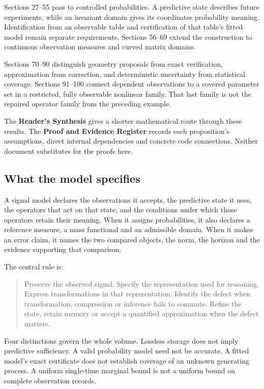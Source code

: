 \documentclass[11pt,letterpaper]{article}
\begin{document}
Sections 27--55 pass to controlled probabilities. A predictive state
describes future experiments, while an invariant domain gives its
coordinates probability meaning. Identification from an observable table
and certification of that table's fitted model remain separate
requirements. Sections 56--69 extend the construction to continuous
observation measures and curved matrix domains.

Sections 70--90 distinguish geometry proposals from exact verification,
approximation from correction, and deterministic uncertainty from
statistical coverage. Sections 91--100 connect dependent observations to
a covered parameter set in a restricted, fully observable nonlinear
family. That last family is not the repaired operator family from the
preceding example.

The \textbf{Reader's Synthesis} gives a shorter mathematical route
through these results. The \textbf{Proof and Evidence Register} records
each proposition's assumptions, direct internal dependencies and
concrete code connections. Neither document substitutes for the proofs
here.

\subsection{What the model specifies}\label{what-the-model-specifies}

A signal model declares the observations it accepts, the predictive
state it uses, the operators that act on that state, and the conditions
under which those operators retain their meaning. When it assigns
probabilities, it also declares a reference measure, a mass functional
and an admissible domain. When it makes an error claim, it names the two
compared objects, the norm, the horizon and the evidence supporting that
comparison.

The central rule is:

\begin{quote}
Preserve the observed signal. Specify the representation used for
reasoning. Express transformations in that representation. Identify the
defect when transformation, compression or inference fails to commute.
Refine the state, retain memory or accept a quantified approximation
when the defect matters.
\end{quote}

Four distinctions govern the whole volume. Lossless storage does not
imply predictive sufficiency. A valid probability model need not be
accurate. A fitted model's exact certificate does not establish coverage
of an unknown generating process. A uniform single-time marginal bound
is not a uniform bound on complete observation records.
\end{document}
